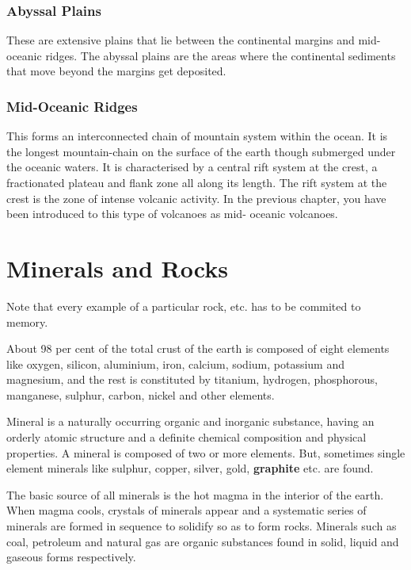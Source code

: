 \documentclass[8pt, a4paper, oneside, twocolumn]{extarticle}
\begin{document}
\subsubsection{Abyssal Plains}
These are extensive plains that lie between the continental margins and mid-oceanic ridges. The abyssal plains are the areas where the continental sediments that move beyond the margins get deposited.
\subsubsection{Mid-Oceanic Ridges}
This forms an interconnected chain of mountain system within the ocean. It is the longest mountain-chain on the surface of the earth though submerged under the oceanic waters. It is characterised by a central rift system at the crest, a fractionated plateau and flank zone all along its length. The rift system at the crest is the zone of intense volcanic activity. In the previous chapter, you have been introduced to this type of volcanoes as mid- oceanic volcanoes.


\section{Minerals and Rocks}
\begin{tcolorbox}
  Note that every example of a particular rock, etc. has to be commited to memory.
\end{tcolorbox}
About 98 per cent of the total crust of the earth is composed of eight elements like oxygen, silicon, aluminium, iron, calcium, sodium, potassium and magnesium, and the rest is constituted by titanium, hydrogen, phosphorous, manganese, sulphur, carbon, nickel and other elements.

Mineral is a naturally occurring organic and inorganic substance, having an orderly atomic structure and a definite chemical composition and physical properties. A mineral is composed of two or more elements. But, sometimes single element minerals like sulphur, copper, silver, gold, \textbf{graphite} etc. are found.

The basic source of all minerals is the hot magma in the interior of the earth. When magma cools, crystals of minerals appear and a systematic series of minerals are formed in sequence to solidify so as to form rocks. Minerals such as coal, petroleum and natural gas are organic substances found in solid, liquid and gaseous forms respectively.
\end{document}

